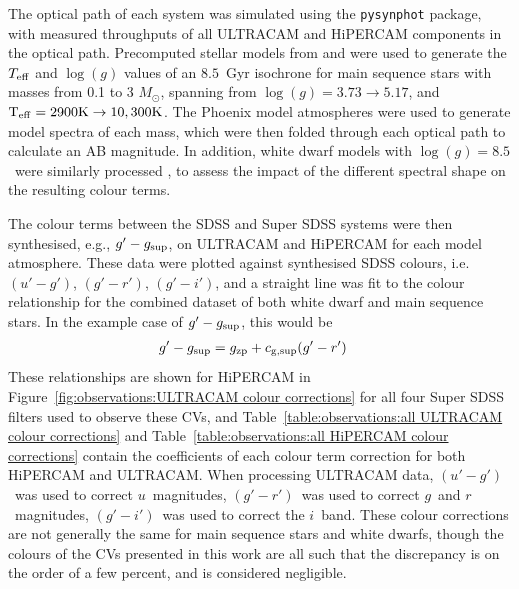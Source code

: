 The optical path of each system was simulated using the \texttt{pysynphot} package, with measured throughputs of all ULTRACAM and HiPERCAM components in the optical path. Precomputed stellar models from \citet{Dotter2016} and \citet{Choi2016} were used to generate the $T_{\rm eff}$ and $\log(g)$ values of an $8.5$\ Gyr isochrone for main sequence stars with masses from 0.1 to 3 $M_\odot$, spanning from $\log(g)= 3.73 \to 5.17$, and $\rm{T_{eff}} = 2900K \to 10,300K$. The Phoenix model atmospheres \citep{allard2012} were used to generate model spectra of each mass, which were then folded through each optical path to calculate an AB magnitude. In addition, white dwarf models with $\log(g)=8.5$\ were similarly processed \citep{koester2010, tremblay2009}, to assess the impact of the different spectral shape on the resulting colour terms.

The colour terms between the SDSS and Super SDSS systems were then synthesised, e.g., $g'-g_{\rm sup}$, on ULTRACAM and HiPERCAM for each model atmosphere. These data were plotted against synthesised SDSS colours, i.e. $(u'-g')$, $(g'-r')$, $(g'-i')$, and a straight line was fit to the colour relationship for the combined dataset of both white dwarf and main sequence stars. In the example case of $g'-g_{\rm sup}$, this would be
\begin{align*}
    g' - g_{\rm sup} &= g_{\rm zp} + c_{\rm g, sup}(g'-r')
\end{align*}
These relationships are shown for HiPERCAM in Figure~\ref{fig:observations:ULTRACAM colour corrections} for all four Super SDSS filters used to observe these CVs, and Table~\ref{table:observations:all ULTRACAM colour corrections} and Table~\ref{table:observations:all HiPERCAM colour corrections} contain the coefficients of each colour term correction for both HiPERCAM and ULTRACAM.
When processing ULTRACAM data, $(u'-g')$\ was used to correct $u$\ magnitudes, $(g'-r')$\ was used to correct $g$\ and $r$\ magnitudes, $(g'-i')$\ was used to correct the $i$\ band.
These colour corrections are not generally the same for main sequence stars and white dwarfs, though the colours of the CVs presented in this work are all such that the discrepancy is on the order of a few percent, and is considered negligible.

